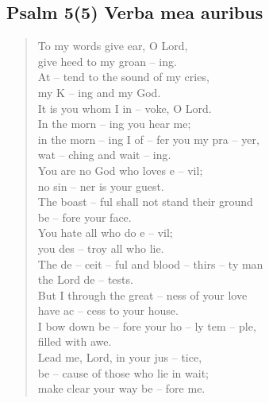 \subsection*{Psalm 5(5) Verba mea auribus}
\begin{flushleft}
\begin{verse}
 To my words give ear, O Lord,\\
give heed to my groan -- ing.\\
 At -- tend to the sound of my cries,\\
my K -- ing and my God.\\
\vspace{5 mm}
 It is you whom I in -- voke, O Lord.\\
In the morn -- ing you hear me;\\
in the morn -- ing I of -- fer you my pra -- yer,\\
wat -- ching and wait -- ing.\\
\vspace{5 mm}
 You are no God who loves e -- vil;\\
no sin -- ner is your guest.\\
 The boast -- ful shall not stand their ground\\
be -- fore your face.\\
\vspace{5 mm}
 You hate all who do e -- vil;\\
you des -- troy all who lie.\\
The de -- ceit -- ful and blood -- thirs -- ty man\\
the Lord de -- tests.\\
\vspace{5 mm}
 But I through the great -- ness of your love\\
have ac -- cess to your house.\\
I bow down be -- fore your ho -- ly tem -- ple,\\
filled with awe.\\
\vspace{5 mm}
 Lead me, Lord, in your jus -- tice,\\
be -- cause of those who lie in wait;\\
make clear your way be -- fore me.\\
\vspace{5 mm}

\end{verse}
\end{flushleft}
